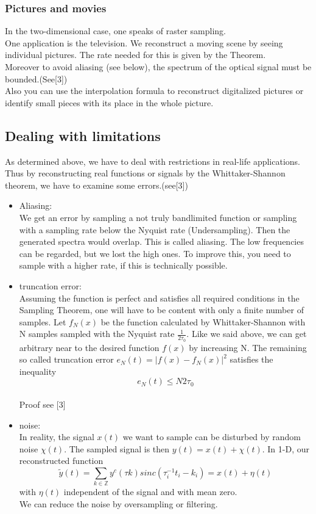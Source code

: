 \documentclass[a4paper, 11pt]{scrreprt}
\newcommand{\ZZ}{\mathbb{Z}}
\begin{document}
\subsubsection*{Pictures and movies}
In the two-dimensional case, one speaks of raster sampling. \\
One application is the television. We reconstruct a moving scene by seeing individual pictures. The rate needed for this is given by the Theorem.\\
Moreover to avoid aliasing (see below), the spectrum of the optical signal must be bounded.(See[3])\\
Also you can use the interpolation formula to reconstruct digitalized pictures or identify small pieces with its place in the whole picture.\\




\subsection*{Dealing with limitations}
As determined above, we have to deal with restrictions in real-life applications.\\
Thus by reconstructing real functions or signals by the Whittaker-Shannon theorem, we have to examine some errors.(see[3])
\begin{itemize}
\item Aliasing:\\
We get an error by sampling a not truly bandlimited function or sampling with a sampling rate below the Nyquist rate (Undersampling). Then the generated spectra would overlap. This is called aliasing. The low frequencies can be regarded, but we lost the high ones. To improve this, you need to sample with a higher rate, if this is technically possible.\\

\item truncation error:\\
Assuming the function is perfect and satisfies all required conditions in the Sampling Theorem, one will have to be content with only a finite number of samples. Let $ f_N(x) $ be the function calculated by Whittaker-Shannon with N samples sampled with the Nyquist rate $ \frac{1}{2\tau_0} $. Like we said above, we can get arbitrary near to the desired function $f(x)$ by increasing N. The remaining so called truncation error $ e_N(t)=\vert f(x)-f_N(x)\vert^2 $ satisfies the inequality \[ e_N(t) \leq N2\tau_0\]\\
Proof see [3]

\item noise:\\
In reality, the signal $x(t) $ we want to sample can be disturbed by random noise $\chi(t)$. The sampled signal is then $ y(t)=x(t)+\chi(t) $. In 1-D, our reconstructed function \[ \tilde{y}(t) = \sum_{k \in \ZZ} y^c(\tau k)  sinc\left(\tau_i^{-1} t_i -k_i\right)=x(t)+\eta(t) \] with $ \eta(t) $ independent of the signal and with mean zero.\\
We can reduce the noise by oversampling or filtering.
\end{itemize}


\nocite{marks02}
\nocite{fornasier03}



\end{document}
